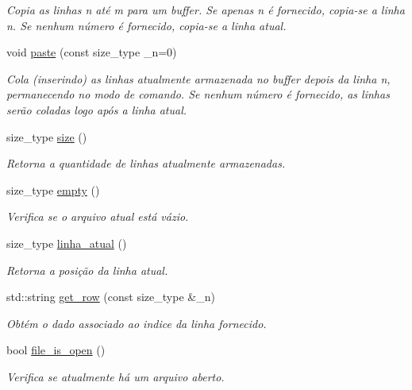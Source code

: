\begin{DoxyCompactItemize}
\begin{DoxyCompactList}\small\item\em Copia as linhas n até m para um buffer. Se apenas n é fornecido, copia-\/se a linha n. Se nenhum número é fornecido, copia-\/se a linha atual. \end{DoxyCompactList}\item 
void \hyperlink{classelis_ad140924a1cb1425b573934a3abd4475c}{paste} (const size\+\_\+type \+\_\+n=0)
\begin{DoxyCompactList}\small\item\em Cola (inserindo) as linhas atualmente armazenada no buffer depois da linha n, permanecendo no modo de comando. Se nenhum número é fornecido, as linhas serão coladas logo após a linha atual. \end{DoxyCompactList}\item 
size\+\_\+type \hyperlink{classelis_ab869080dfc9c83c577e4550eed1f17c1}{size} ()
\begin{DoxyCompactList}\small\item\em Retorna a quantidade de linhas atualmente armazenadas. \end{DoxyCompactList}\item 
size\+\_\+type \hyperlink{classelis_a20956774b5e7ce5bdb6e411c027497f4}{empty} ()
\begin{DoxyCompactList}\small\item\em Verifica se o arquivo atual está vázio. \end{DoxyCompactList}\item 
size\+\_\+type \hyperlink{classelis_ae2b126d77fd190c84cabb303537a5265}{linha\+\_\+atual} ()
\begin{DoxyCompactList}\small\item\em Retorna a posição da linha atual. \end{DoxyCompactList}\item 
std\+::string \hyperlink{classelis_a9dd72229bed65be90429180f7259d129}{get\+\_\+row} (const size\+\_\+type \&\+\_\+n)
\begin{DoxyCompactList}\small\item\em Obtém o dado associado ao indice da linha fornecido. \end{DoxyCompactList}\item 
bool \hyperlink{classelis_a47227a09ae7cf66bc40fae46220664d6}{file\+\_\+is\+\_\+open} ()
\begin{DoxyCompactList}\small\item\em Verifica se atualmente há um arquivo aberto. \end{DoxyCompactList}\item 

\end{DoxyCompactItemize}
